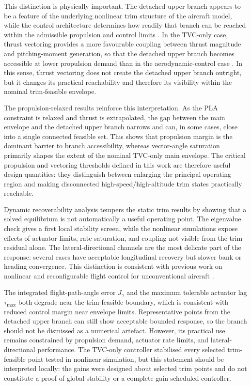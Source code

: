 \documentclass[conf]{new-aiaa}
\begin{document}
This distinction is physically important. The detached upper branch appears to be a feature of the underlying nonlinear trim structure of the aircraft model, while the control architecture determines how readily that branch can be reached within the admissible propulsion and control limits \cite{ParanjapeSinhaAnanthkrishnan2007,SharmaEtAl2015}. In the TVC-only case, thrust vectoring provides a more favourable coupling between thrust magnitude and pitching-moment generation, so that the detached upper branch becomes accessible at lower propulsion demand than in the aerodynamic-control case \cite{BosworthStoliker1996,ParkChoiJo2017,WoodBauer1999}. In this sense, thrust vectoring does not create the detached upper branch outright, but it changes its practical reachability and therefore its visibility within the nominal trim-feasible envelope.

The propulsion-relaxed results reinforce this interpretation. As the PLA constraint is relaxed and thrust is extrapolated, the gap between the main envelope and the detached upper branch narrows and can, in some cases, close into a single connected feasible set. This shows that propulsion margin is the dominant barrier to branch accessibility, whereas vector-angle saturation primarily shapes the extent of the nominal TVC-only main envelope. The critical propulsion and vectoring thresholds defined in this work are therefore useful design quantities: they distinguish between enlarging the principal operating region and making disconnected high-speed/high-altitude trim states practically reachable.

Dynamic recoverability analysis tempers the static trim results by showing that a solved equilibrium is not automatically a useful operating point. The eigenvalue check gives a first local stability screen, while the nonlinear simulations expose effects of actuator limits, rate saturation, and coupling not visible from the trim residual alone. The lateral-directional channels are the most delicate part of the response: several cases have acceptable longitudinal recovery but slower bank or heading convergence. This distinction is consistent with previous work on nonlinear and reconfigurable flight control for unconventional aircraft \cite{BaconOstroff2000,Proctor2019}.

The integrated flight-path-angle error $J_\gamma$ and the maximum tolerable actuator lag $\tau_{\max}$ both degrade near the trim-feasible boundary, which is consistent with reduced control margin near envelope limits. Representative points from the detached upper branch can still show acceptable bounded response, so the branch should not be dismissed as a numerical artefact. However, its practical use remains constrained by propulsion demand, actuator rate limits, and lateral-directional performance. The TVC-only controller stabilised every selected trim-feasible point tested in nonlinear simulation, but this statement should be interpreted locally: the gains were designed about selected trim points and do not constitute a proof of global stability or a complete gain-scheduled controller.
\end{document}
